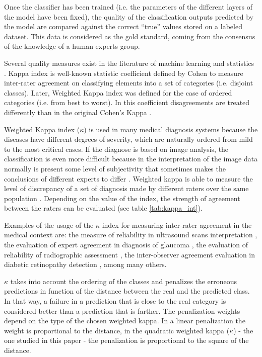 \documentclass[times,twocolumn,final,authoryear]{elsarticle}
\begin{document}
Once the classifier has been trained (i.e. the parameters of the different layers of the model have been fixed), the quality of the classification outputs predicted by the model are compared against the correct "`true"' values stored on a labeled dataset. This data is considered as the gold standard, coming from the consensus of the knowledge of a human experts group.

Several quality measures exist in the literature of machine learning and statistics \citep{mehdiyev2016evaluating}. 
Kappa index is well-known statistic coefficient defined by Cohen \citep{cohen1960coefficient} to measure inter-rater agreement on classifying elements into a set of categories (i.e. disjoint classes).
Later, Weighted Kappa index was defined for the case of ordered categories (i.e. from best to worst). In this coefficient disagreements are treated differently than in the original Cohen's Kappa \citep{cohen1968weighted}. 

Weighted Kappa index ($\kappa$) is used in many medical diagnosis systems because the diseases have different degrees of severity, which are naturally ordered from mild to the most critical cases. If the diagnose is based on image analysis, the classification is even more difficult because in the interpretation of the image data normally is present some level of subjectivity that sometimes makes the conclusions of different experts to differ \citep{hripcsak2002measuring}.
Weighted kappa is able to measure the level of discrepancy of a set of diagnosis made by different raters over the same population \citep{viera2005understanding}. Depending on the value of the index, the strength of agreement between the raters can be evaluated (see table \ref{tab:kappa_int}). 

Examples of the usage of the $\kappa$ index for measuring inter-rater agreement in the medical context are: the measure of reliability in ultrasound scans interpretation \citep{hintz2007interobserver}, the evaluation of expert agreement in diagnosis of glaucoma \citep{varma1992expert}, the evaluation of reliability of radiographic assessment \citep{gunther1999reliability}, the inter-observer agreement evaluation in diabetic retinopathy detection \citep{patra2009interobserver}, among many others. 

$\kappa$ takes into account the ordering of the classes and penalizes the erroneous predictions in function of the distance between the real and the predicted class. In that way, a failure in a prediction that is close to the real category is considered better than a prediction that is farther. The penalization weights depend on the type of the chosen weighted kappa. In a linear penalization the weight is proportional to the distance, in the quadratic weighted kappa ($\kappa$) - the one studied in this paper - the penalization is proportional to the square of the distance. %
\end{document}
